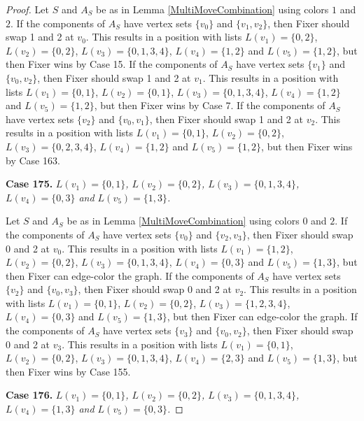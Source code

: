 \documentclass[12pt]{amsart}
\theoremstyle{plain}
\theoremstyle{definition}
\theoremstyle{remark}
\begin{document}
\begin{proof}
Let $S$ and $A_S$ be as in Lemma \ref{MultiMoveCombination} using colors $1$ and $2$. If the components of $A_S$ have vertex sets $\{v_0\}$ and $\{v_1, v_2\}$, then Fixer should swap 1 and 2 at $v_0$. This results in a position with lists $L(v_1) = \{0, 2\}$, $L(v_2) = \{0, 2\}$, $L(v_3) = \{0, 1, 3, 4\}$, $L(v_4) = \{1, 2\}$ and $L(v_5) = \{1, 2\}$, but then Fixer wins by Case 15. If the components of $A_S$ have vertex sets $\{v_1\}$ and $\{v_0, v_2\}$, then Fixer should swap 1 and 2 at $v_1$. This results in a position with lists $L(v_1) = \{0, 1\}$, $L(v_2) = \{0, 1\}$, $L(v_3) = \{0, 1, 3, 4\}$, $L(v_4) = \{1, 2\}$ and $L(v_5) = \{1, 2\}$, but then Fixer wins by Case 7. If the components of $A_S$ have vertex sets $\{v_2\}$ and $\{v_0, v_1\}$, then Fixer should swap 1 and 2 at $v_2$. This results in a position with lists $L(v_1) = \{0, 1\}$, $L(v_2) = \{0, 2\}$, $L(v_3) = \{0, 2, 3, 4\}$, $L(v_4) = \{1, 2\}$ and $L(v_5) = \{1, 2\}$, but then Fixer wins by Case 163. 

\noindent\textbf{Case 175.  }\textit{$L(v_1) = \{0, 1\}$, $L(v_2) = \{0, 2\}$, $L(v_3) = \{0, 1, 3, 4\}$, $L(v_4) = \{0, 3\}$ and $L(v_5) = \{1, 3\}$.}

Let $S$ and $A_S$ be as in Lemma \ref{MultiMoveCombination} using colors $0$ and $2$. If the components of $A_S$ have vertex sets $\{v_0\}$ and $\{v_2, v_3\}$, then Fixer should swap 0 and 2 at $v_0$. This results in a position with lists $L(v_1) = \{1, 2\}$, $L(v_2) = \{0, 2\}$, $L(v_3) = \{0, 1, 3, 4\}$, $L(v_4) = \{0, 3\}$ and $L(v_5) = \{1, 3\}$, but then Fixer can edge-color the graph. If the components of $A_S$ have vertex sets $\{v_2\}$ and $\{v_0, v_3\}$, then Fixer should swap 0 and 2 at $v_2$. This results in a position with lists $L(v_1) = \{0, 1\}$, $L(v_2) = \{0, 2\}$, $L(v_3) = \{1, 2, 3, 4\}$, $L(v_4) = \{0, 3\}$ and $L(v_5) = \{1, 3\}$, but then Fixer can edge-color the graph. If the components of $A_S$ have vertex sets $\{v_3\}$ and $\{v_0, v_2\}$, then Fixer should swap 0 and 2 at $v_3$. This results in a position with lists $L(v_1) = \{0, 1\}$, $L(v_2) = \{0, 2\}$, $L(v_3) = \{0, 1, 3, 4\}$, $L(v_4) = \{2, 3\}$ and $L(v_5) = \{1, 3\}$, but then Fixer wins by Case 155. 

\noindent\textbf{Case 176.  }\textit{$L(v_1) = \{0, 1\}$, $L(v_2) = \{0, 2\}$, $L(v_3) = \{0, 1, 3, 4\}$, $L(v_4) = \{1, 3\}$ and $L(v_5) = \{0, 3\}$.}


\end{proof}
\end{document}
